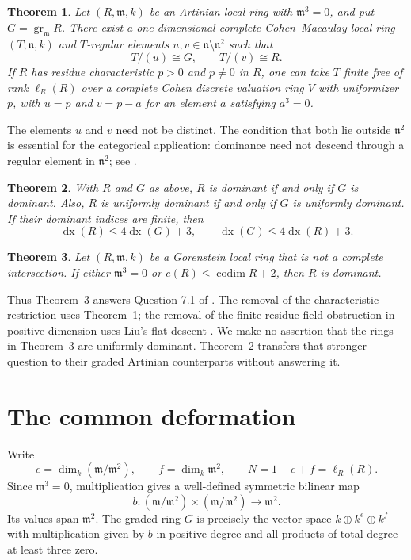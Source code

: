 \documentclass[11pt]{article}
\newtheorem{theorem}{Theorem}[section]
\theoremstyle{remark}\newtheorem{remark}[theorem]{Remark}
\newcommand{\m}{\mathfrak m}
\newcommand{\n}{\mathfrak n}
\newcommand{\gr}{\operatorname{gr}}
\newcommand{\codim}{\operatorname{codim}}
\newcommand{\dx}{\operatorname{dx}}
\begin{document}
\begin{theorem}\label{thm:deform}
Let $(R,\m,k)$ be an Artinian local ring with $\m^3=0$, and put $G=\gr_{\m}R$. There exist a one-dimensional complete Cohen--Macaulay local ring $(T,\n,k)$ and $T$-regular elements $u,v\in\n\setminus\n^2$ such that
\begin{equation}\label{eq:quotients}
 T/(u)\cong G,\qquad T/(v)\cong R.
\end{equation}
If $R$ has residue characteristic $p>0$ and $p\ne0$ in $R$, one can take $T$ finite free of rank $\ell_R(R)$ over a complete Cohen discrete valuation ring $V$ with uniformizer $p$, with $u=p$ and $v=p-a$ for an element $a$ satisfying $a^3=0$.
\end{theorem}

The elements $u$ and $v$ need not be distinct. The condition that both lie outside $\n^2$ is essential for the categorical application: dominance need not descend through a regular element in $\n^2$; see \cite[Corollary 6.12]{T}.

\begin{theorem}\label{thm:transfer}
With $R$ and $G$ as above, $R$ is dominant if and only if $G$ is dominant. Also, $R$ is uniformly dominant if and only if $G$ is uniformly dominant. If their dominant indices are finite, then
\begin{equation}\label{eq:indices}
 \dx(R)\le4\dx(G)+3,\qquad \dx(G)\le4\dx(R)+3.
\end{equation}
\end{theorem}

\begin{theorem}\label{thm:gorenstein}
Let $(R,\m,k)$ be a Gorenstein local ring that is not a complete intersection. If either $\m^3=0$ or $e(R)\le\codim R+2$, then $R$ is dominant.
\end{theorem}

Thus Theorem~\ref{thm:gorenstein} answers Question 7.1 of \cite{KT}. The removal of the characteristic restriction uses Theorem~\ref{thm:deform}; the removal of the finite-residue-field obstruction in positive dimension uses Liu's flat descent \cite{L}. We make no assertion that the rings in Theorem~\ref{thm:gorenstein} are uniformly dominant. Theorem~\ref{thm:transfer} transfers that stronger question to their graded Artinian counterparts without answering it.

\section{The common deformation}
Write
\[
 e=\dim_k(\m/\m^2),\qquad f=\dim_k\m^2,\qquad N=1+e+f=\ell_R(R).
\]
Since $\m^3=0$, multiplication gives a well-defined symmetric bilinear map
\begin{equation}\label{eq:tensor}
 b:(\m/\m^2)\times(\m/\m^2)\longrightarrow\m^2.
\end{equation}
Its values span $\m^2$. The graded ring $G$ is precisely the vector space $k\oplus k^e\oplus k^f$ with multiplication given by $b$ in positive degree and all products of total degree at least three zero.
\end{document}
